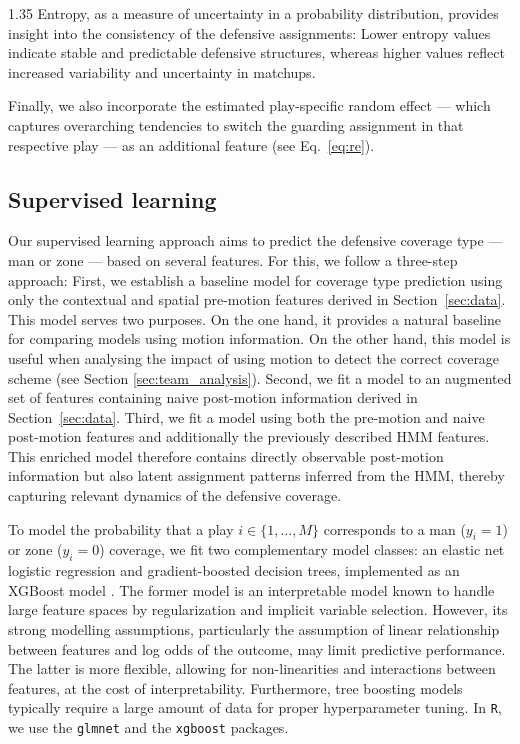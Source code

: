 \documentclass[12pt,a4paper]{article}
\begin{document}
\begin{spacing}{1.35}
Entropy, as a measure of uncertainty in a probability distribution, provides insight into the consistency of the defensive assignments: Lower entropy values indicate stable and predictable defensive structures, whereas higher values reflect increased variability and uncertainty in matchups. 

Finally, we also incorporate the estimated play-specific random effect --- which captures overarching tendencies to switch the guarding assignment in that respective play --- as an additional feature (see Eq.~\ref{eq:re}).

\subsection{Supervised learning}
Our supervised learning approach aims to predict the defensive coverage type --- man or zone --- based on several features. %
For this, we follow a three-step approach: First, we establish a baseline model for coverage type prediction using only the contextual and spatial pre-motion features derived in Section~\ref{sec:data}. This model serves two purposes. On the one hand, it provides a natural baseline for comparing models using motion information. On the other hand, this model is useful when analysing the impact of using motion to detect the correct coverage scheme (see Section \ref{sec:team_analysis}). Second, we fit a model to an augmented set of features containing naive post-motion information derived in Section~\ref{sec:data}. Third, we fit a model using both the pre-motion and naive post-motion features and additionally the previously described HMM features. This enriched model therefore contains directly observable post-motion information but also latent assignment patterns inferred from the HMM, thereby capturing relevant dynamics of the defensive coverage.

To model the probability that a play \( i \in \{1, \dots, M\} \) corresponds to a man (\( y_i = 1 \)) or zone (\( y_i = 0 \)) coverage, we fit two complementary model classes: an elastic net logistic regression \citep{Zou05elastic} and gradient-boosted decision trees, implemented as an XGBoost model \citep{chen2016xgboost}. The former model is an interpretable model known to handle large feature spaces by regularization and implicit variable selection. However, its strong modelling assumptions, particularly the assumption of linear relationship between features and log odds of the outcome, may limit predictive performance. The latter is more flexible, allowing for non-linearities and interactions between features, at the cost of interpretability. Furthermore, tree boosting models typically require a large amount of data for proper hyperparameter tuning. In \texttt{R}, we use the \texttt{glmnet} \citep{friedman2021package} and the \texttt{xgboost} \citep{chen2019package} packages.


\end{spacing}
\end{document}
